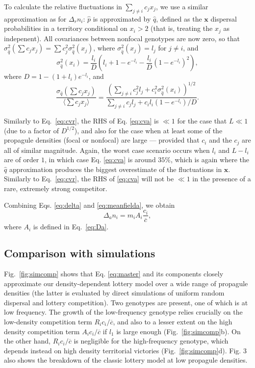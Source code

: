 \documentclass[11pt]{article}
\begin{document}
To calculate the relative fluctuations in $\sum_{j\neq i} c_j x_j$, we use a similar approximation as for $\Delta_r n_i$: $\hat{p}$ is approximated by $\hat{q}$, defined as the ${\mathbf x}$ dispersal probabilities in a territory conditional on $x_i>2$ (that is, treating the $x_j$ as indepenent). All covariances between nonfocal genotypes are now zero, so that $\sigma_{\hat{q}}^2(\sum c_j x_j)=\sum c_j^2 \sigma_{\hat{q}}^2(x_j)$, where $\sigma_{\hat{q}}^2(x_j)=l_j$ for $j\neq i$, and  
\begin{equation}
\sigma_{\hat{q}}^2(x_i)=\frac{l_i}{D}\left(l_i+1-e^{-l_i}-\frac{l_i}{D}\left(1-e^{-l_i}\right)^2\right),
\end{equation}
where $D= 1-(1+l_i)e^{-l_i}$, and 
\begin{equation}
\frac{\sigma_{\hat{q}}(\sum c_j x_j)}{\langle\sum c_j x_j\rangle} = \frac{\left(\sum_{j\neq i} c_j^2 l_j + c_i^2 \sigma_{\hat{q}}^2(x_i)\right)^{1/2}}{\sum_{j\neq i} c_j l_j + c_i l_i (1-e^{-l_i})/D} \label{eq:cva}.
\end{equation}

Similarly to Eq.~\eqref{eq:cvr}, the RHS of Eq. \eqref{eq:cva} is $\ll 1$ for the case that $L \ll 1$ (due to a factor of $D^{1/2}$), and also for the case when at least some of the propagule densities (focal or nonfocal) are large --- provided that $c_i$ and the $c_j$ are all of similar magnitude. Again, the worst case scenario occurs when $l_i$ and $L-l_i$ are of order $1$, in which case Eq. \eqref{eq:cva} is around $35\%$, which is again where the $\hat{q}$ approximation produces the biggest overestimate of the fluctuations in ${\mathbf x}$. Similarly to Eq.~\eqref{eq:cvr}, the RHS of \eqref{eq:cva} will not be $\ll 1$ in the presence of a rare, extremely strong competitor.  

Combining Eqs. \eqref{eq:delta} and \eqref{eq:meanfielda}, we obtain
\begin{equation}
\Delta_a n_i=m_i A_i \frac{c_i}{\overline{c}},
\end{equation}
where $A_i$ is defined in Eq.~\eqref{eq:Da}.

\subsection*{Comparison with simulations}

Fig.~\ref{fig:simcomp} shows that Eq. \eqref{eq:master} and its components closely approximate our density-dependent lottery model over a wide range of propagule densities (the latter is evaluated by direct simulations of uniform random dispersal and lottery competition). Two genotypes are present, one of which is at low frequency. The growth of the low-frequency genotype relies crucially on the low-density competition term $R_i c_i/\overline{c}$, and also to a lesser extent on the high density competition term $A_i c_i/\overline{c}$ if $l_1$ is large enough (Fig.~\ref{fig:simcomp}b). On the other hand, $R_i c_i/\overline{c}$ is negligible for the high-frequency genotype, which depends instead on high density territorial victories (Fig.~\ref{fig:simcomp}d). Fig. 3 also shows the breakdown of the classic lottery model at low propagule densities.
\end{document}
